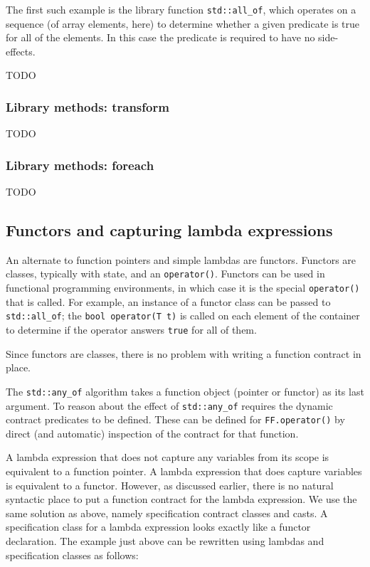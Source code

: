The first such example is the library function \lstinline|std::all_of|,
which operates on a sequence (of array elements, here) to determine
whether a given predicate is true for all of the elements. In this
case the predicate is required to have no side-effects.

TODO

\subsubsection{Library methods: transform}

TODO

\subsubsection{Library methods: foreach}

TODO

\subsection{Functors and capturing lambda expressions}
\label{sec:functors}

An alternate to function pointers and simple lambdas are functors. Functors are classes, typically with state, and an
\lstinline|operator()|. Functors can be used in functional programming environments, in which case it is the special 
\lstinline|operator()| that is called. For example, an instance of a functor class can be passed to 
\lstinline|std::all_of|; the \lstinline|bool operator(T t)| is called on each element of the container to determine if
the operator answers \lstinline|true| for all of them.

Since functors are classes, there is no problem with writing a function contract in place.



The \lstinline|std::any_of| algorithm takes a function object (pointer or functor) as its last argument. To reason about
the effect of \lstinline|std::any_of| requires the dynamic contract predicates to be defined. These can be defined for 
\lstinline|FF.operator()| by direct (and automatic) inspection of the contract for that function.

A lambda expression that does not capture any variables from its scope is equivalent to a function pointer.
A lambda expression
that does capture variables is equivalent to a functor. 
However, as discussed earlier, there is no natural syntactic place to
put a function contract for the lambda expression. We use the same solution as above, namely specification contract classes and casts.
A specification class for a lambda expression looks exactly like a functor declaration. 
The example just above can be rewritten using lambdas and specification classes as follows:

